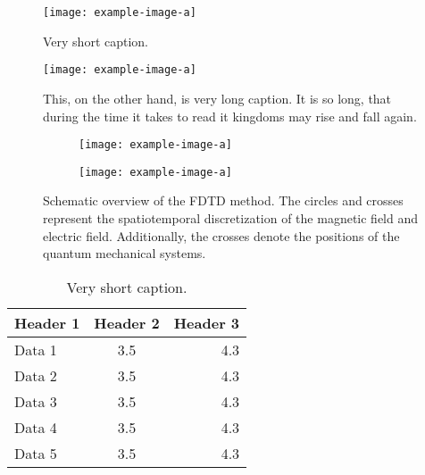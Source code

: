 \blindtext

\begin{figure}
  \centering
  \texttt{[image: example-image-a]}
  \caption{Very short caption.}
\end{figure}

\begin{figure}
  \centering
  \texttt{[image: example-image-a]}
  \caption{This, on the other hand, is very long caption. It is so long, that
    during the time it takes to read it kingdoms may rise and fall again.}
\end{figure}

\begin{figure}
  \begin{subfigure}[t]{.4\textwidth}
    \centering
    \texttt{[image: example-image-a]}
    \label{fig:grid_a}
  \end{subfigure}
  \hfill
  \begin{subfigure}[t]{.5\textwidth}
    \centering
    \texttt{[image: example-image-a]}
    \label{fig:grid_b}
  \end{subfigure}
  \centering
  \caption{Schematic overview of the FDTD method. The circles and crosses
    represent the spatiotemporal discretization of the magnetic field and
    electric field. Additionally, the crosses denote the positions of the
    quantum mechanical systems.}
  \label{fig:grid}
\end{figure}

\begin{table}
  \caption{Very short caption.}
  \centering
  \begin{tabular}{lcr}
    \toprule
    Header 1 & Header 2 & Header 3 \\
    \midrule
    Data 1   & 3.5      & 4.3      \\
    Data 2   & 3.5      & 4.3      \\
    Data 3   & 3.5      & 4.3      \\
    Data 4   & 3.5      & 4.3      \\
    Data 5   & 3.5      & 4.3      \\
    \bottomrule
  \end{tabular}
\end{table}

